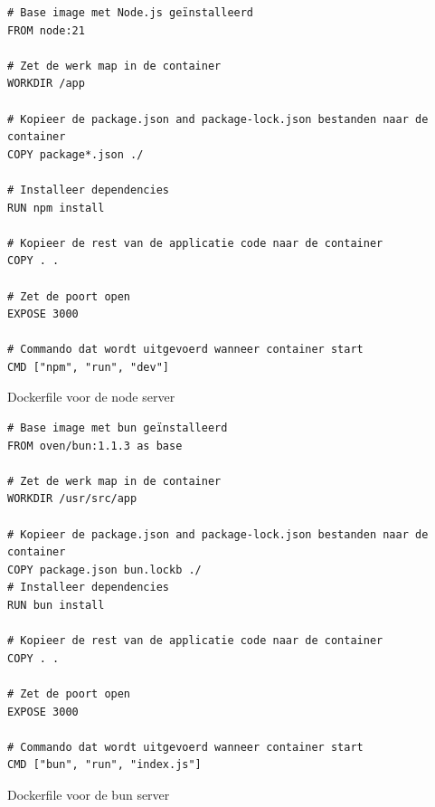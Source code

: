 \begin{listing}[H]
  \centering
  \begin{verbatim}
# Base image met Node.js geïnstalleerd
FROM node:21

# Zet de werk map in de container
WORKDIR /app

# Kopieer de package.json and package-lock.json bestanden naar de container
COPY package*.json ./

# Installeer dependencies
RUN npm install

# Kopieer de rest van de applicatie code naar de container
COPY . .

# Zet de poort open
EXPOSE 3000

# Commando dat wordt uitgevoerd wanneer container start
CMD ["npm", "run", "dev"]
      \end{verbatim}
      \caption{\label{code:dockernode}Dockerfile voor de node server}
\end{listing}


\begin{listing}[H]
  \centering
  \begin{verbatim}
# Base image met bun geïnstalleerd
FROM oven/bun:1.1.3 as base

# Zet de werk map in de container
WORKDIR /usr/src/app

# Kopieer de package.json and package-lock.json bestanden naar de container
COPY package.json bun.lockb ./
# Installeer dependencies
RUN bun install

# Kopieer de rest van de applicatie code naar de container
COPY . .

# Zet de poort open
EXPOSE 3000

# Commando dat wordt uitgevoerd wanneer container start
CMD ["bun", "run", "index.js"]
      \end{verbatim}
      \caption{\label{code:dockerbun}Dockerfile voor de bun server}
\end{listing}

